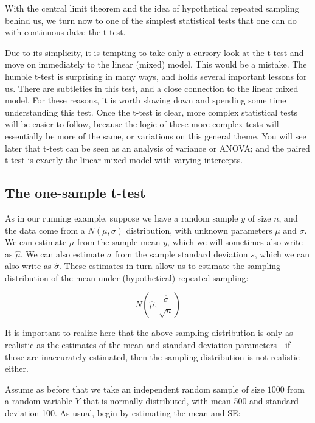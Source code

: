 \documentclass[12pt,]{krantz}
\begin{document}
With the central limit theorem and the idea of hypothetical repeated sampling behind us, we turn now to one of the simplest statistical tests that one can do with continuous data: the t-test.

Due to its simplicity, it is tempting to take only a cursory look at the t-test and move on immediately to the linear (mixed) model. This would be a mistake. The humble t-test is surprising in many ways, and holds several important lessons for us. There are subtleties in this test, and a close connection to the linear mixed model. For these reasons, it is worth slowing down and spending some time understanding this test. Once the t-test is clear, more complex statistical tests will be easier to follow, because the logic of these more complex tests will essentially be more of the same, or variations on this general theme. You will see later that t-test can be seen as an analysis of variance or ANOVA; and the paired t-test is exactly the linear mixed model with varying intercepts.

\hypertarget{the-one-sample-t-test}{%
\subsection{The one-sample t-test}\label{the-one-sample-t-test}}

As in our running example, suppose we have a random sample \(y\) of size \(n\), and the data come from a \(N(\mu,\sigma)\) distribution, with unknown parameters \(\mu\) and \(\sigma\). We can estimate \(\mu\) from the sample mean \(\bar{y}\), which we will sometimes also write as \(\hat \mu\). We can also estimate \(\sigma\) from the sample standard deviation \(s\), which we can also write as \(\hat\sigma\). These estimates in turn allow us to estimate the sampling distribution of the mean under (hypothetical) repeated sampling:

\begin{equation}
N(\hat\mu,\frac{\hat \sigma}{\sqrt{n}})
\end{equation}

It is important to realize here that the above sampling distribution is only as realistic as the estimates of the mean and standard deviation parameters---if those are inaccurately estimated, then the sampling distribution is not realistic either.

Assume as before that we take an independent random sample of size \(1000\) from a random variable \(Y\) that is normally distributed, with mean 500 and standard deviation 100. As usual, begin by estimating the mean and SE:
\end{document}
